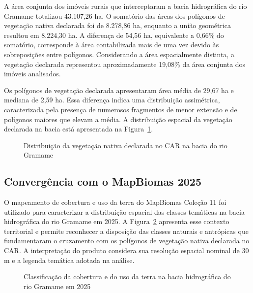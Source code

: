 A área conjunta dos imóveis rurais que interceptaram a bacia hidrográfica do rio Gramame totalizou 43.107,26 ha. O somatório das áreas dos polígonos de vegetação nativa declarada foi de 8.278,86 ha, enquanto a união geométrica resultou em 8.224,30 ha. A diferença de 54,56 ha, equivalente a 0,66\% do somatório, corresponde à área contabilizada mais de uma vez devido às sobreposições entre polígonos. Considerando a área espacialmente distinta, a vegetação declarada representou aproximadamente 19,08\% da área conjunta dos imóveis analisados.

Os polígonos de vegetação declarada apresentaram área média de 29,67 ha e mediana de 2,59 ha. Essa diferença indica uma distribuição assimétrica, caracterizada pela presença de numerosos fragmentos de menor extensão e de polígonos maiores que elevam a média. A distribuição espacial da vegetação declarada na bacia está apresentada na Figura~\ref{fig:vegetacao}.

\begin{figure}[H]
\centering
\caption{Distribuição da vegetação nativa declarada no CAR na bacia do rio Gramame}
\label{fig:vegetacao}
\end{figure}

\subsection{Convergência com o MapBiomas 2025}

O mapeamento de cobertura e uso da terra do MapBiomas Coleção 11 foi utilizado para caracterizar a distribuição espacial das classes temáticas na bacia hidrográfica do rio Gramame em 2025. A Figura~\ref{fig:mapbiomas} apresenta esse contexto territorial e permite reconhecer a disposição das classes naturais e antrópicas que fundamentaram o cruzamento com os polígonos de vegetação nativa declarada no CAR. A interpretação do produto considera sua resolução espacial nominal de 30 m e a legenda temática adotada na análise.

\begin{figure}[H]
\centering
\caption{Classificação da cobertura e do uso da terra na bacia hidrográfica do rio Gramame em 2025}
\label{fig:mapbiomas}
\end{figure}


